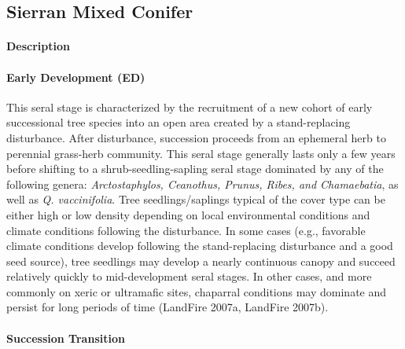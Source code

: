 \subsection*{Sierran Mixed Conifer }

\paragraph{Description}
\paragraph{Early Development (ED)} This seral stage is characterized by the recruitment of a new cohort of early successional tree species into an open area created by a stand-replacing disturbance. After disturbance, succession proceeds from an ephemeral herb to perennial grass-herb community. This seral stage generally lasts only a few years before shifting to a shrub-seedling-sapling seral stage dominated by any of the following genera: \emph{Arctostaphylos, Ceanothus, Prunus, Ribes, and Chamaebatia}, as well as \emph{Q. vaccinifolia}. Tree seedlings/saplings typical of the cover type can be either high or low density depending on local environmental conditions and climate conditions following the disturbance. In some cases (e.g., favorable climate conditions develop following the stand-replacing disturbance and a good seed source), tree seedlings may develop a nearly continuous canopy and succeed relatively quickly to mid-development seral stages. In other cases, and more commonly on xeric or ultramafic sites, chaparral conditions may dominate and persist for long periods of time (LandFire 2007a, LandFire 2007b).

\paragraph{Succession Transition}

